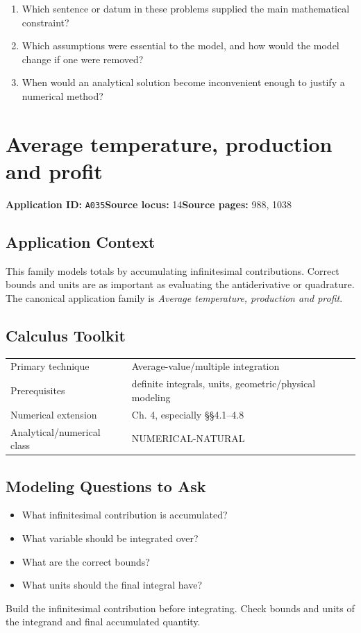 \documentclass[11pt]{book}
\newcommand{\pid}[1]{\texttt{#1}}
\begin{document}
\begin{reflectionbox}\begin{enumerate}
\item Which sentence or datum in these problems supplied the main mathematical constraint?
\item Which assumptions were essential to the model, and how would the model change if one were removed?
\item When would an analytical solution become inconvenient enough to justify a numerical method?
\end{enumerate}\end{reflectionbox}
\chapter{Average temperature, production and profit}\label{app:A035}
\textbf{Application ID:} \pid{A035}\quad \textbf{Source locus:} 14\quad \textbf{Source pages:} 988, 1038
\section*{Application Context}
This family models totals by accumulating infinitesimal contributions. Correct bounds and units are as important as evaluating the antiderivative or quadrature. The canonical application family is \emph{Average temperature, production and profit}.
\section*{Calculus Toolkit}
\begin{tabularx}{\textwidth}{@{}lX@{}}\toprule
Primary technique & Average-value/multiple integration \\
Prerequisites & definite integrals, units, geometric/physical modeling \\
Numerical extension & Ch. 4, especially §§4.1–4.8 \\
Analytical/numerical class & NUMERICAL-NATURAL \\
\bottomrule\end{tabularx}
\section*{Modeling Questions to Ask}\begin{itemize}
\item What infinitesimal contribution is accumulated?
\item What variable should be integrated over?
\item What are the correct bounds?
\item What units should the final integral have?
\end{itemize}
\begin{errorbox}Build the infinitesimal contribution before integrating. Check bounds and units of the integrand and final accumulated quantity.\end{errorbox}
\end{document}
